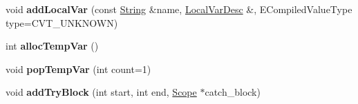 \begin{DoxyCompactItemize}
\item 
void {\bfseries add\+Local\+Var} (const \hyperlink{class_object_script_1_1_o_s_1_1_core_1_1_string}{String} \&name, \hyperlink{struct_object_script_1_1_o_s_1_1_core_1_1_compiler_1_1_local_var_desc}{Local\+Var\+Desc} \&, E\+Compiled\+Value\+Type type=C\+V\+T\+\_\+\+U\+N\+K\+N\+O\+WN)\hypertarget{struct_object_script_1_1_o_s_1_1_core_1_1_compiler_1_1_scope_afafad4e49aad2b3106ec5b4fae3f42f0}{}\label{struct_object_script_1_1_o_s_1_1_core_1_1_compiler_1_1_scope_afafad4e49aad2b3106ec5b4fae3f42f0}

\item 
int {\bfseries alloc\+Temp\+Var} ()\hypertarget{struct_object_script_1_1_o_s_1_1_core_1_1_compiler_1_1_scope_a347f7581d84f0f64f8e97ea4893d4d8e}{}\label{struct_object_script_1_1_o_s_1_1_core_1_1_compiler_1_1_scope_a347f7581d84f0f64f8e97ea4893d4d8e}

\item 
void {\bfseries pop\+Temp\+Var} (int count=1)\hypertarget{struct_object_script_1_1_o_s_1_1_core_1_1_compiler_1_1_scope_a86037f94b5b6716f7dac222cf02edb28}{}\label{struct_object_script_1_1_o_s_1_1_core_1_1_compiler_1_1_scope_a86037f94b5b6716f7dac222cf02edb28}

\item 
void {\bfseries add\+Try\+Block} (int start, int end, \hyperlink{struct_object_script_1_1_o_s_1_1_core_1_1_compiler_1_1_scope}{Scope} $\ast$catch\+\_\+block)\hypertarget{struct_object_script_1_1_o_s_1_1_core_1_1_compiler_1_1_scope_a6b361ad2ccb3d535da98a66074dc7baf}{}\label{struct_object_script_1_1_o_s_1_1_core_1_1_compiler_1_1_scope_a6b361ad2ccb3d535da98a66074dc7baf}

\end{DoxyCompactItemize}
